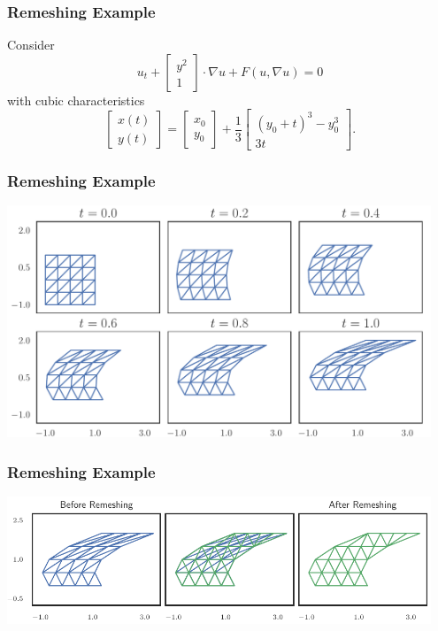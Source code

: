 \documentclass{beamer}
\begin{document}
\begin{frame}
\frametitle{Remeshing Example}
Consider
\begin{equation*}
u_t + \left[ \begin{array}{c} y^2 \\ 1 \end{array}\right] \cdot \nabla u +
  F\left(u, \nabla u\right) = 0
\end{equation*}
\pause
with cubic characteristics
\begin{equation*}
\left[ \begin{array}{c} x(t) \\ y(t) \end{array}\right] =
  \left[ \begin{array}{c} x_0 \\ y_0 \end{array}\right] +
  \frac{1}{3} \left[ \begin{array}{c} (y_0 + t)^3 - y_0^3 \\
  3t \end{array}\right].
\end{equation*}
\end{frame}

\begin{frame}
\frametitle{Remeshing Example}
\begin{center}
\includegraphics[width=0.95\textwidth]
                {../images/slides/mesh_distortion.pdf}
\end{center}
\end{frame}

\begin{frame}
\frametitle{Remeshing Example}
\begin{center}
\includegraphics[width=0.95\textwidth]
                {../images/solution-transfer/distortion_remesh.pdf}
\end{center}
\end{frame}
\end{document}
